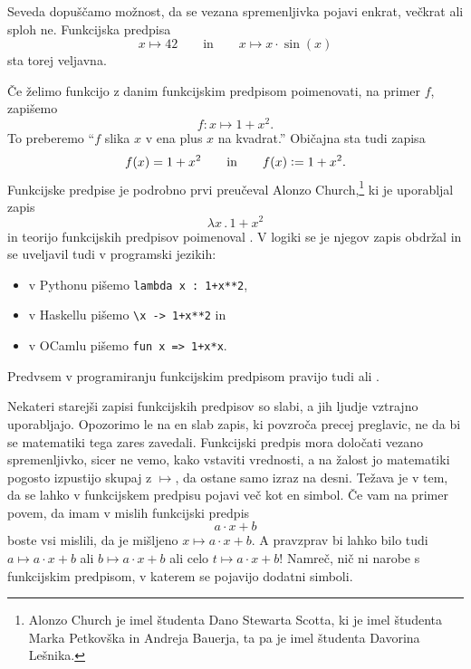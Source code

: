 Seveda dopuščamo možnost, da se vezana spremenljivka pojavi enkrat, večkrat ali sploh ne.
Funkcijska predpisa
%
%
\begin{equation*}
  x \mapsto 42
  \qquad\text{in}\qquad
  x \mapsto x \cdot \sin(x)
\end{equation*}
%
sta torej veljavna.

Če želimo funkcijo z danim funkcijskim predpisom poimenovati, na primer $f$, zapišemo
%
\begin{equation*}
  f : x \mapsto 1 + x^2.
\end{equation*}
%
To preberemo ``$f$ slika $x$ v ena plus $x$ na kvadrat.'' Običajna sta tudi zapisa
%
\begin{equation*}
  f(x) = 1 + x^2
  \qquad\text{in}\qquad
  f(x) \mathrel{\mathop:}= 1 + x^2.
\end{equation*}
%
Funkcijske predpise je podrobno prvi preučeval Alonzo Church,\footnote{Alonzo Church je
  imel študenta Dano Stewarta Scotta, ki je imel študenta Marka Petkovška in Andreja
  Bauerja, ta pa je imel študenta Davorina Lešnika.} ki je uporabljal zapis
%
\begin{equation*}
  \lambda x \,.\, 1 + x^2
\end{equation*}
%
in teorijo funkcijskih predpisov poimenoval . V logiki se je njegov
zapis obdržal in se uveljavil tudi v programski jezikih:
%
\begin{itemize}
\item v Pythonu pišemo \verb|lambda x : 1+x**2|,
\item v Haskellu pišemo \verb|\x -> 1+x**2| in
\item v OCamlu pišemo \verb|fun x => 1+x*x|.
\end{itemize}
%
Predvsem v programiranju funkcijskim predpisom pravijo tudi  ali .

Nekateri starejši zapisi funkcijskih predpisov so slabi, a jih ljudje vztrajno
uporabljajo. Opozorimo le na en slab zapis, ki povzroča precej preglavic, ne da bi se
matematiki tega zares zavedali. Funkcijski predpis mora določati vezano spremenljivko,
sicer ne vemo, kako vstaviti vrednosti, a na žalost jo matematiki pogosto izpustijo skupaj
z $\mapsto$, da ostane samo izraz na desni.
%
Težava je v tem, da se lahko v funkcijskem predpisu pojavi več kot en simbol. Če vam na primer povem, da imam v mislih funkcijski predpis
%
\begin{equation*}
  a \cdot x + b
\end{equation*}
%
boste vsi mislili, da je mišljeno $x \mapsto a \cdot x + b$. A pravzprav bi lahko bilo
tudi $a \mapsto a \cdot x + b$ ali $b \mapsto a \cdot x + b$ ali celo
$t \mapsto a \cdot x + b$! Namreč, nič ni narobe s funkcijskim predpisom, v katerem se
pojavijo dodatni simboli.

